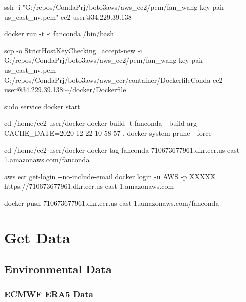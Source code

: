 \documentclass[
]{book}
\newenvironment{Shaded}{\begin{snugshade}}{\end{snugshade}}
\newcommand{\BuiltInTok}[1]{#1}
\newcommand{\ExtensionTok}[1]{#1}
\newcommand{\FunctionTok}[1]{\textcolor[rgb]{0.00,0.00,0.00}{#1}}
\newcommand{\NormalTok}[1]{#1}
\newcommand{\StringTok}[1]{\textcolor[rgb]{0.31,0.60,0.02}{#1}}
\begin{document}
\begin{Shaded}
\begin{Highlighting}[]
\FunctionTok{ssh}\NormalTok{ {-}i }\StringTok{"G:/repos/CondaPrj/boto3aws/aws\_ec2/pem/fan\_wang{-}key{-}pair{-}us\_east\_nv.pem"}\NormalTok{ ec2{-}user@34.229.39.138}

\ExtensionTok{docker}\NormalTok{ run {-}t {-}i fanconda /bin/bash}

\FunctionTok{scp}\NormalTok{ {-}o StrictHostKeyChecking=accept{-}new {-}i G:/repos/CondaPrj/boto3aws/aws\_ec2/pem/fan\_wang{-}key{-}pair{-}us\_east\_nv.pem G:/repos/CondaPrj/boto3aws/aws\_ecr/container/DockerfileConda ec2{-}user@34.229.39.138:\textasciitilde{}/docker/Dockerfile}

\FunctionTok{sudo}\NormalTok{ service docker start}

\BuiltInTok{cd}\NormalTok{ /home/ec2{-}user/docker}
\ExtensionTok{docker}\NormalTok{ build {-}t fanconda {-}{-}build{-}arg CACHE\_DATE=2020{-}12{-}22{-}10{-}58{-}57 .}
\ExtensionTok{docker}\NormalTok{ system prune {-}{-}force}

\BuiltInTok{cd}\NormalTok{ /home/ec2{-}user/docker}
\ExtensionTok{docker}\NormalTok{ tag fanconda 710673677961.dkr.ecr.us{-}east{-}1.amazonaws.com/fanconda}

\ExtensionTok{aws}\NormalTok{ ecr get{-}login {-}{-}no{-}include{-}email}
\ExtensionTok{docker}\NormalTok{ login {-}u AWS {-}p XXXXX= https://710673677961.dkr.ecr.us{-}east{-}1.amazonaws.com}

\ExtensionTok{docker}\NormalTok{ push 710673677961.dkr.ecr.us{-}east{-}1.amazonaws.com/fanconda}
\end{Highlighting}
\end{Shaded}

\hypertarget{get-data}{%
\chapter{Get Data}\label{get-data}}

\hypertarget{environmental-data}{%
\section{Environmental Data}\label{environmental-data}}

\hypertarget{ecmwf-era5-data}{%
\subsection{ECMWF ERA5 Data}\label{ecmwf-era5-data}}
\end{document}
